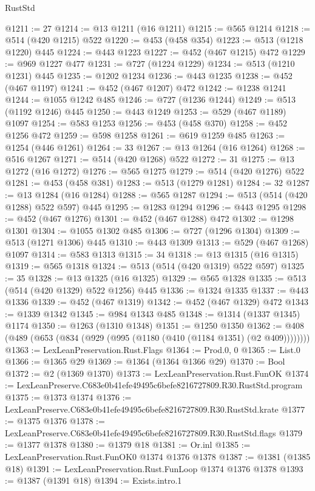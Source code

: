 \begin{lexlean}{RustStd}
\begin{coremodule}
@1211 := 27
@1214 := @13 @1211 (@16 @1211)
@1215 := @565 @1214
@1218 := @514 (@420 @1215) @522
@1220 := @453 (@458 @354)
@1223 := @513 (@1218 @1220) @445
@1224 := @443 @1223
@1227 := @452 (@467 @1215) @472
@1229 := @969 @1227 @477
@1231 := @727 (@1224 @1229)
@1234 := @513 (@1210 @1231) @445
@1235 := @1202 @1234
@1236 := @443 @1235
@1238 := @452 (@467 @1197)
@1241 := @452 (@467 @1207) @472
@1242 := @1238 @1241
@1244 := @1055 @1242 @485
@1246 := @727 (@1236 @1244)
@1249 := @513 (@1192 @1246) @445
@1250 := @443 @1249
@1253 := @529 (@467 @1189) @1097
@1254 := @583 @1253
@1256 := @453 (@458 @370)
@1258 := @452 @1256 @472
@1259 := @598 @1258
@1261 := @619 @1259 @485
@1263 := @1254 (@446 @1261)
@1264 := 33
@1267 := @13 @1264 (@16 @1264)
@1268 := @516 @1267
@1271 := @514 (@420 @1268) @522
@1272 := 31
@1275 := @13 @1272 (@16 @1272)
@1276 := @565 @1275
@1279 := @514 (@420 @1276) @522
@1281 := @453 (@458 @381)
@1283 := @513 (@1279 @1281)
@1284 := 32
@1287 := @13 @1284 (@16 @1284)
@1288 := @565 @1287
@1294 := @513 (@514 (@420 @1288) @522 @597) @445
@1295 := @1283 @1294
@1296 := @443 @1295
@1298 := @452 (@467 @1276)
@1301 := @452 (@467 @1288) @472
@1302 := @1298 @1301
@1304 := @1055 @1302 @485
@1306 := @727 (@1296 @1304)
@1309 := @513 (@1271 @1306) @445
@1310 := @443 @1309
@1313 := @529 (@467 @1268) @1097
@1314 := @583 @1313
@1315 := 34
@1318 := @13 @1315 (@16 @1315)
@1319 := @565 @1318
@1324 := @513 (@514 (@420 @1319) @522 @597)
@1325 := 35
@1328 := @13 @1325 (@16 @1325)
@1329 := @565 @1328
@1335 := @513 (@514 (@420 @1329) @522 @1256) @445
@1336 := @1324 @1335
@1337 := @443 @1336
@1339 := @452 (@467 @1319)
@1342 := @452 (@467 @1329) @472
@1343 := @1339 @1342
@1345 := @984 @1343 @485
@1348 := @1314 (@1337 @1345) @1174
@1350 := @1263 (@1310 @1348)
@1351 := @1250 @1350
@1362 := @408 (@489 (@653 (@834 (@929 (@995 (@1180 (@410 (@1184 @1351) (@2 @409))))))))
@1363 := LexLeanPreservation.Rust.Flags
@1364 := Prod.{0, 0}
@1365 := List.{0}
@1366 := @1365 @29
@1369 := @1364 (@1364 @1366 @29)
@1370 := Bool
@1372 := @2 (@1369 @1370)
@1373 := LexLeanPreservation.Rust.FunOK
@1374 := LexLeanPreserve.C683e0b41efe49495c6befe8216727809.R30.RustStd.program
@1375 := @1373 @1374
@1376 := LexLeanPreserve.C683e0b41efe49495c6befe8216727809.R30.RustStd.krate
@1377 := @1375 @1376
@1378 := LexLeanPreserve.C683e0b41efe49495c6befe8216727809.R30.RustStd.flags
@1379 := @1377 @1378
@1380 := @1379 @18
@1381 := Or.inl
@1385 := LexLeanPreservation.Rust.FunOK0 @1374 @1376 @1378
@1387 := @1381 (@1385 @18)
@1391 := LexLeanPreservation.Rust.FunLoop @1374 @1376 @1378
@1393 := @1387 (@1391 @18)
@1394 := Exists.intro.{1}

\end{coremodule}
\end{lexlean}
